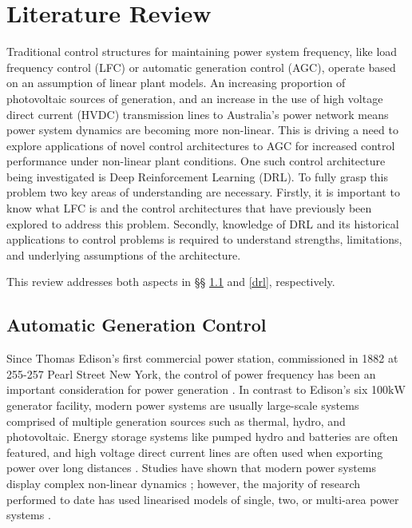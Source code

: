 \section{Literature Review}
Traditional control structures for maintaining power system frequency, like load frequency control (LFC) or automatic generation control (AGC), operate based on an assumption of linear plant models. An increasing proportion of photovoltaic sources of generation, and an increase in the use of high voltage direct current (HVDC) transmission lines to Australia's power network means power system dynamics are becoming more non-linear. This is driving a need to explore applications of novel control architectures to AGC for increased control performance under non-linear plant conditions. One such control architecture being investigated is Deep Reinforcement Learning (DRL). To fully grasp this problem two key areas of understanding are necessary. Firstly, it is important to know what LFC is and the control architectures that have previously been explored to address this problem. Secondly, knowledge of DRL and its historical applications to control problems is required to understand strengths, limitations, and underlying assumptions of the architecture.

This review addresses both aspects in \S{}\S{} \ref{agc} and \ref{drl}, respectively.


\subsection{Automatic Generation Control}\label{agc}
Since Thomas Edison's first commercial power station, commissioned in 1882 at 255-257 Pearl Street New York, the control of power frequency has been an important consideration for power generation \cite{Cohn1983}. In contrast to Edison's six 100$\si{\kilo\watt}$ generator facility, modern power systems are usually large-scale systems comprised of multiple generation sources such as thermal, hydro, and photovoltaic. Energy storage systems like pumped hydro and batteries are often featured, and high voltage direct current lines are often used when exporting power over long distances \cite{Bevrani2011, Glover2012, Kothari2011, Kundur1994}. Studies have shown that modern power systems display complex non-linear dynamics \cite{Concordia1957, Kwatny1975, Elgerd1994, Morsali2014}; however, the majority of research performed to date has used linearised models of single, two, or multi-area power systems \cite{Kothari2011, Saadat2011, Cohn1956, Bevrani2011, Wood2013, Elgerd1970, Kwatny1975}.

